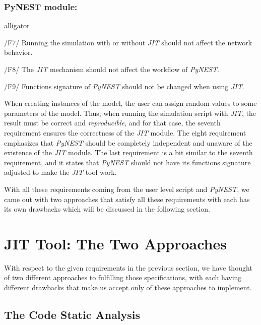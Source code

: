 \subsubsection*{PyNEST module:}

\begin{labeling}{alligator}
   \item  [/F7/] Running the simulation with or without \emph{JIT} should not affect the network behavior.\\
   
     
   \item [/F8/] The \emph{JIT} mechanism should not affect the workflow of \emph{PyNEST}.\\
   
   \item  [/F9/] Functions signature of \emph{PyNEST} should not be changed when using \emph{JIT}.\\

\end{labeling}

When creating instances of the model, the user can assign random values to some parameters of the model. Thus, when running the simulation script with \emph{JIT}, the result must be correct and \emph{reproducible}, and for that  case, the seventh requirement ensures the correctness of the \emph{JIT} module. The eight requirement emphasizes that \emph{PyNEST} should be completely independent and unaware of the existence of the \emph{JIT} module. The last requirement is a bit similar to the seventh requirement, and it states that  \emph{PyNEST}  should not have its functions signature adjusted to make the \emph{JIT} tool work.


With all these requirements coming from the user level script and \emph{PyNEST}, we came out with two approaches that satisfy all these requirements with each has its own drawbacks which will be discussed in the following section.

\section{JIT Tool: The Two Approaches}

With respect to the given requirements in the previous section, we have thought of two different approaches to fulfilling those specifications, with each having different drawbacks that make us accept only of these approaches to implement.

\subsection{The Code Static Analysis}

